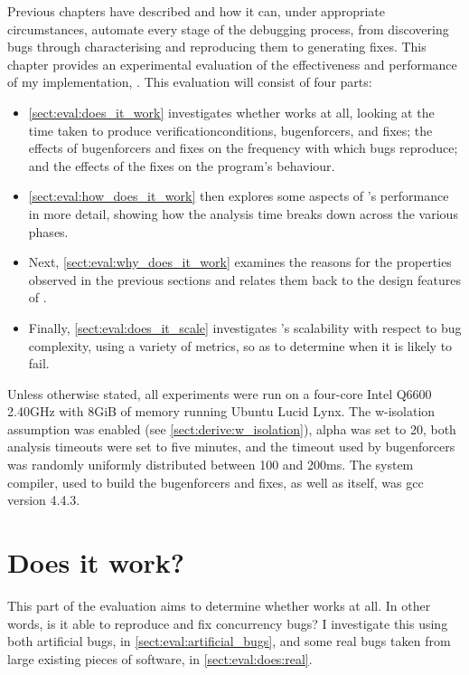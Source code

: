 \noindent
Previous chapters have described {\technique} and how it can, under
appropriate circumstances, automate every stage of the debugging
process, from discovering bugs through characterising and reproducing
them to generating fixes.  This chapter provides an experimental
evaluation of the effectiveness and performance of my implementation,
{\implementation}.  This evaluation will consist of four parts:
\begin{itemize}
\item \autoref{sect:eval:does_it_work} investigates whether
  {\implementation} works at all, looking at the time taken to produce
  \glspl{verificationcondition}, \glspl{bugenforcer}, and fixes; the
  effects of \glspl{bugenforcer} and fixes on the frequency with which
  bugs reproduce; and the effects of the fixes on the program's
  behaviour.
\item \autoref{sect:eval:how_does_it_work} then explores some aspects
  of {\implementation}'s performance in more detail, showing how the
  analysis time breaks down across the various phases.
\item Next, \autoref{sect:eval:why_does_it_work} examines the reasons
  for the properties observed in the previous sections and relates
  them back to the design features of {\technique}.
\item Finally, \autoref{sect:eval:does_it_scale} investigates
  {\implementation}'s scalability with respect to bug complexity, using a
  variety of metrics, so as to determine when it is likely to fail.
\end{itemize}
Unless otherwise stated, all experiments were run on a four-core Intel
Q6600 2.40GHz with 8GiB of memory running Ubuntu Lucid Lynx.  The
\gls{w-isolation} assumption was enabled (see
\autoref{sect:derive:w_isolation}), \gls{alpha} was set to 20, both
analysis timeouts were set to five minutes, and the timeout used by
\glspl{bugenforcer} was randomly uniformly distributed between 100 and
200ms.  The system compiler, used to build the \glspl{bugenforcer} and
fixes, as well as {\implementation} itself, was gcc version 4.4.3.

\section{Does it work?}
\label{sect:eval:does_it_work}

This part of the evaluation aims to determine whether
{\implementation} works at all.  In other words, is it able to
reproduce and fix concurrency bugs?  I investigate this using both
artificial bugs, in \autoref{sect:eval:artificial_bugs}, and some real
bugs taken from large existing pieces of software, in
\autoref{sect:eval:does:real}.

